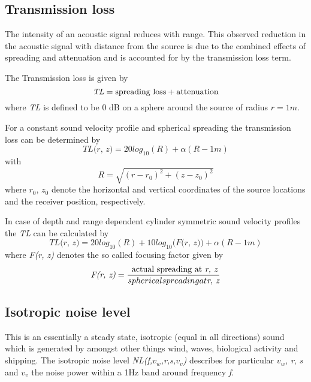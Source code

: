 \subsection{ Transmission loss } \label{ Transmission loss }
\noindent The intensity of an acoustic signal reduces with range. This observed reduction in the acoustic signal with distance from the source is due to the combined effects of spreading and attenuation and is accounted for by the transmission loss term.

\noindent The Transmission loss is given by
\begin{equation}
\textit{TL} = \textnormal{spreading loss} + \textnormal{attenuation} 
\end{equation}
\noindent where \textit{TL} is defined to be 0 dB on a sphere around the source of radius $\textit{r} = 1m.$

\noindent For a constant sound velocity profile and spherical spreading the transmission loss can be determined by
\begin{equation}
\textit{TL(r, z)} = 20 log_{10}{(R)} + \alpha (\textit{R} - 1m)
\end{equation}
\noindent with
\begin{equation}
\textit{R} = \sqrt{ (\textit{r} - \textit{$r_{0}$})^{2} + (\textit{z} - \textit{$z_{0}$})^{2} }
\end{equation}
\noindent where \textit{$r_{0}$}, \textit{$z_{0}$} denote the horizontal and vertical coordinates of the source locations and the receiver position, respectively.

\noindent In case of depth and range dependent cylinder symmetric sound velocity profiles the \textit{TL} can be calculated by
\begin{equation}
\textit{TL(r, z)} = 20 log_{10}{(R)} + 10log_{10}{(\textit{F(r, z))}}  + \alpha (\textit{R} - 1m)
\end{equation}
\noindent where \textit{F(r, z)} denotes the so called focusing factor given by
\begin{equation}
\textit{F(r, z)} = \frac{ \textnormal{ actual spreading at \textit{r, z}}}{ spherical spreading at \textit{r, z}}
\end{equation}

\subsection{ Isotropic noise level } \label{ Isotropic noise level }
\noindent This is an essentially a steady state, isotropic (equal in all directions) sound which is generated by amongst other things wind, waves, biological activity and shipping. The isotropic noise level \textit{NL(f,$v_w$,r,s,$v_v$)} describes for particular \textit{$v_w$}, \textit{r}, \textit{s} and \textit{$v_v$} the noise power within a 1Hz band around frequency \textit{f}.

